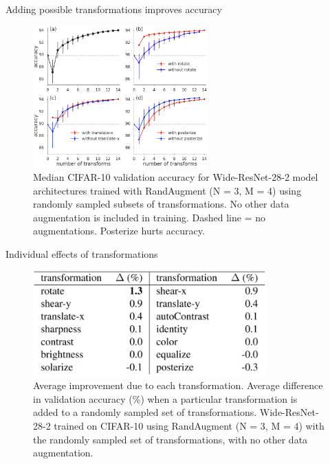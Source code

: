 \documentclass{beamer}
\begin{document}
\begin{frame}{Adding possible transformations improves accuracy}
\begin{figure}[h]
\includegraphics[width=0.6\textwidth]{img/N}
\caption{Median CIFAR-10 validation accuracy for Wide-ResNet-28-2 model architectures trained with RandAugment (N = 3, M = 4) using randomly sampled subsets of transformations. No other data augmentation is included in training. Dashed line = no augmentations. Posterize hurts accuracy.}
\end{figure}
\end{frame}
\begin{frame}{Individual effects of transformations}
\begin{figure}[h]
\includegraphics[width=0.8\textwidth]{img/trans}
\caption{Average improvement due to each transformation. Average difference in validation accuracy (\%) when a particular transformation is added to a randomly sampled set of transformations. Wide-ResNet-28-2 trained on CIFAR-10 using RandAugment (N = 3, M = 4) with the randomly sampled set of transformations, with no other data augmentation.}
\end{figure}
\end{frame}
\end{document}
